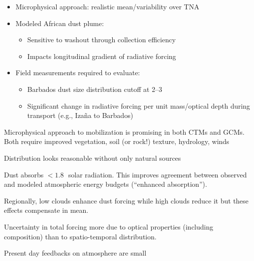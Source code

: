 \documentclass[final,dvips]{foils}
\begin{document}
\rotatefoilhead{\bgl\Large\textcolor{blue}{\hfill Conclusions \hfill}}\large\vspace{-0.5in} 
\enlargethispage*{1in} 
\begin{itemize}
\item Microphysical approach: realistic mean/variability over TNA
\item Modeled African dust plume:
\begin{itemize}
\item Sensitive to washout through collection efficiency
\item Impacts longitudinal gradient of radiative forcing
\end{itemize}
\item Field measurements required to evaluate:
\begin{itemize}
\item Barbados dust size distribution cutoff at 2--3\,\um\ 
\item Significant change in radiative forcing per unit mass/optical
depth during transport (e.g., Iza\~na to Barbados)
\end{itemize}
\end{itemize}

\rotatefoilhead{\bgl\Large\textcolor{blue}{\hfill Conclusions \hfill}}\large\vspace{-0.5in} 
\enlargethispage*{1in} 
\begin{itemize*}
\item Microphysical approach to mobilization is promising in both 
CTMs and GCMs. 
Both require improved vegetation, soil (or rock!) texture, hydrology, winds
\item Distribution looks reasonable without only natural sources
\item Dust absorbs $< 1.8$\,\wxmS\ solar radiation. 
This improves agreement between observed and modeled atmospheric
energy budgets (``enhanced absorption'').
\item Regionally, low clouds enhance dust forcing while
high clouds reduce it but these effects compensate in mean.
\item Uncertainty in total forcing more due to optical properties
(including composition) than to spatio-temporal distribution. 
\item Present day feedbacks on atmosphere are small
\end{itemize*}
\end{document}
